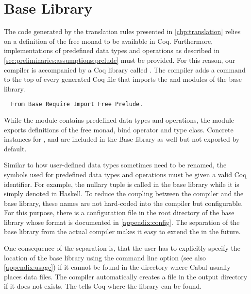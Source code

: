 \section{Base Library} \label{sec:implementation:base-library}
The code generated by the translation rules presented in \autoref{chp:translation} relies on a definition of the free monad to be available in Coq.
Furthermore, implementations of predefined data types and operations as described in \autoref{sec:preliminaries:assumptions:prelude} must be provided.
For this reason, our compiler is accompanied by a Coq library called .
The compiler adds a command to the top of every generated Coq file that imports the  and  modules of the base library.
\begin{verbatim}
  From Base Require Import Free Prelude.
\end{verbatim}

While the  module contains predefined data types and operations, the  module exports definitions of the free monad, bind operator and  type class.
Concrete instances for ,  and  are included in the Base library as well but not exported by default.

Similar to how user-defined data types sometimes need to be renamed, the symbols used for predefined data types and operations must be given a valid Coq identifier.
For example, the nullary tuple is called  in the base library while it is simply denoted \haskell{()} in Haskell.
To reduce the coupling between the compiler and the base library, these names are not hard-coded into the compiler but configurable.
For this purpose, there is a  configuration file in the root directory of the base library whose format is documented in \autoref{appendix:config}.
The separation of the base library from the actual compiler makes it easy to extend the  in the future.

One consequence of the separation is, that the user has to explicitly specify the location of the base library using the  command line option (see also \autoref{appendix:usage}) if it cannot be found in the directory where Cabal usually places data files.
The compiler automatically creates a  file in the output directory if it does not exists.
The  tells Coq where the  library can be found.
